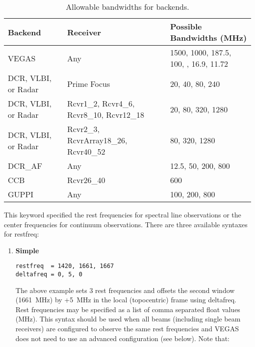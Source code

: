 \begin{description}[leftmargin=*,font=\bfseries\large]
\begin{table}[!h]
\begin{center}
\caption[Allowed bandwidths]
{Allowable bandwidths for backends.\label{table:bw}}
\begin{tabular}{ll p{}}
\toprule
Backend  &  Receiver & Possible Bandwidths (MHz)\\
\midrule
VEGAS & Any & 1500, 1000, 187.5, 100, \newline
                    23.44, 16.9, 11.72 \\
\midrule
DCR, VLBI, or Radar  & Prime Focus  & 20, 40, 80, 240  \\
\midrule
DCR, VLBI, or Radar  & 
Rcvr1\_2, Rcvr4\_6, Rcvr8\_10, Rcvr12\_18  & 20, 80, 320, 1280  \\
\midrule
DCR, VLBI, or Radar  &
Rcvr2\_3, RcvrArray18\_26, Rcvr40\_52  & 80, 320, 1280  \\
\midrule
DCR\_AF  & Any  & 12.5, 50, 200, 800  \\
\midrule
CCB & Rcvr26\_40 & 600 \\
\midrule
GUPPI    & Any & 100, 200, 800 \\
\bottomrule
\end{tabular}
\end{center}
\end{table}


\item[restfreq]

This keyword specified the rest frequencies for spectral line observations or
the center frequencies for continuum observations.  There are three available
syntaxes for restfreq:

\begin{enumerate}[label=\bfseries{\arabic*.},leftmargin=*]
\item {\bf Simple}

\begin{lstlisting}[language=PythonAstrid,frame=single,framerule=1pt]
restfreq  = 1420, 1661, 1667
deltafreq = 0, 5, 0
\end{lstlisting}
The above example sets 3 rest frequencies and offsets the
second window (1661~MHz) by +5~MHz in the local (topocentric) frame using deltafreq.
Rest frequencies may be specified as a list of comma separated float values (MHz).
This syntax should be used when all beams (including single beam receivers) are
configured to observe the same rest frequencies and \gls{VEGAS} does not need to
use an advanced configuration (see  below).  Note that:


\end{enumerate}
\end{description}
